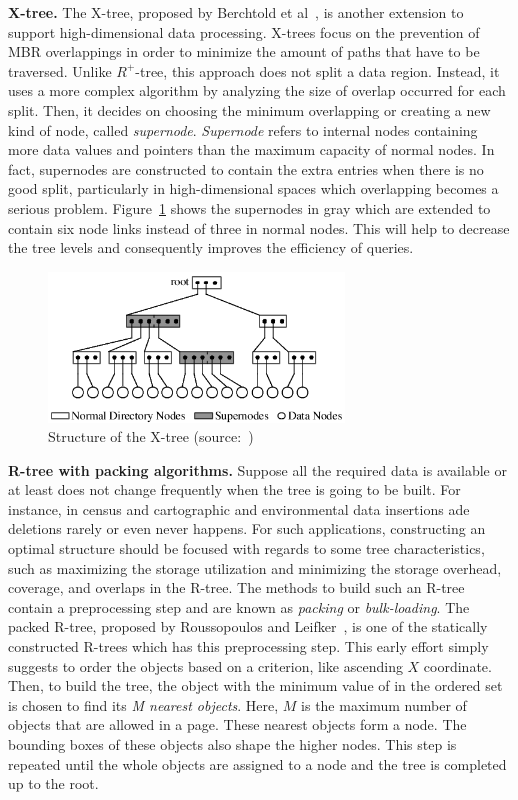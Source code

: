 \documentclass[a4paper,12pt]{article}
\begin{document}
\textbf{X-tree.}
The X-tree, proposed by Berchtold et al~\cite{xtree}, is another extension to support high-dimensional data processing. X-trees focus on the prevention of MBR overlappings in order to minimize the amount of paths that have to be traversed. Unlike $R^+$-tree, this approach does not split a data region. Instead, it uses a more complex algorithm by analyzing the size of overlap occurred for each split. Then, it decides on choosing the minimum overlapping or creating a new kind of node, called \textit{supernode}. \textit{Supernode} refers to internal nodes containing more data values and pointers than the maximum capacity of normal nodes. In fact, supernodes are constructed to contain the extra entries when there is no good split, particularly in high-dimensional spaces which overlapping becomes a serious problem. Figure~\ref{figxtree} shows the supernodes in gray which are extended to contain six node links instead of three in normal nodes. This will help to decrease the tree levels and consequently improves the efficiency of queries.

\begin{figure}
\centering
\includegraphics[width=0.7\textwidth]{xtree}
\caption{Structure of the X-tree (source:~\cite{xtree})}
\label{figxtree}
\end{figure}

\textbf{R-tree with packing algorithms.}
Suppose all the required data is available or at least does not change frequently when the tree is going to be built. For instance, in census and cartographic and environmental data insertions ade deletions rarely or even never happens. 
For such applications, constructing an optimal structure should be focused with regards to some tree characteristics, such as maximizing the storage utilization and minimizing the storage overhead, coverage, and overlaps in the R-tree. The methods to build such an R-tree contain a preprocessing step and are known as \textit{packing} or \textit{bulk-loading}. 
The packed R-tree, proposed by Roussopoulos and Leifker~\cite{packedrtree, packedrtree2}, is one of the statically constructed R-trees which has this preprocessing step. This early effort simply suggests to order the objects based on a criterion, like ascending $X$ coordinate. Then, to build the tree, the object with the minimum value of in the ordered set is chosen to find its \textit{M nearest objects}. Here, $M$ is the maximum number of objects that are allowed in a page. These nearest objects form a node. The bounding boxes of these objects also shape the higher nodes. This step is repeated until the whole objects are assigned to a node and the tree is completed up to the root.
\end{document}
